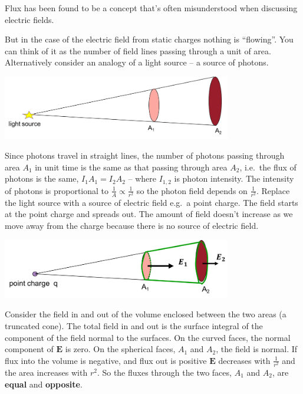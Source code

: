\documentclass[
]{book}
\numberwithin{equation}{section}
\begin{document}
Flux has been found to be a concept that's often misunderstood when
discussing electric fields.

But in the case of the electric field from static charges nothing is
``flowing''. You can think of it as the number of field lines passing
through a unit of area. Alternatively consider an analogy of a light
source -- a source of photons.

\includegraphics[width=100mm,height=\textheight]{Figures/lightFlux.png} \protect\hypertarget{fig:lightFlux}{}{}

Since photons travel in straight lines, the number of photons passing
through area \(A_1\) in unit time is the same as that passing through area
\(A_2\), i.e.~the flux of photons is the same, \(I_1 A_1 = I_2 A_2\) --
where \(I_{1,2}\) is photon intensity. The intensity of photons is
proportional to \(\frac{1}{A} \propto \frac{1}{r^2}\) so the photon field
depends on \(\frac{1}{r^2}\). Replace the light source with a source of
electric field e.g.~a point charge. The field starts at the point charge
and spreads out. The amount of field doesn't increase as we move away
from the charge because there is no source of electric field.

\includegraphics[width=100mm,height=\textheight]{Figures/elecFlux1.png} \protect\hypertarget{fig:elecFlux1}{}{}

Consider the field in and out of the volume enclosed between the two
areas (a truncated cone). The total field in and out is the surface
integral of the component of the field normal to the surfaces. On the
curved faces, the normal component of \(\mathbf{E}\) is zero. On the spherical
faces, \(A_1\) and \(A_2\), the field is normal. If flux into the volume is
negative, and flux out is positive \(\mathbf{E}\) decreases with \(\frac{1}{r^2}\)
and the area increases with \(r^2\). So the fluxes through the two faces,
\(A_1\) and \(A_2\), are \textbf{equal} and \textbf{opposite}.
\end{document}
